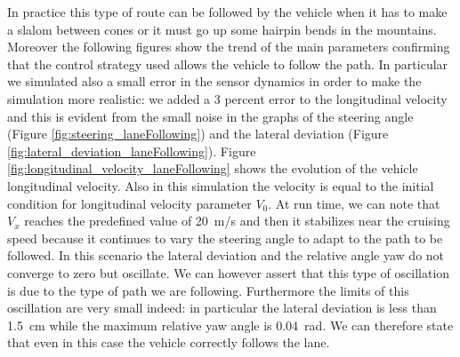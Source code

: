 In practice this type of route can be followed by the vehicle when it has to make a slalom between cones or it must go up some hairpin bends in the mountains. Moreover the following figures show the trend of the main parameters confirming that the control strategy used allows the vehicle to follow the path. In particular we simulated also a small error in the sensor dynamics in order to make the simulation more realistic: we added a 3 percent error to the longitudinal velocity and this is evident from the small noise in the graphs of the steering angle (Figure \ref{fig:steering_laneFollowing}) and the lateral deviation (Figure \ref{fig:lateral_deviation_laneFollowing}).
Figure {\ref{fig:longitudinal_velocity_laneFollowing}} shows the evolution of the vehicle longitudinal velocity. Also in this simulation the velocity is equal to the initial condition for longitudinal velocity parameter $V_0$. At run time, we can note that $V_x$ reaches the predefined value of \SI{20}{m/s} and then it stabilizes near the cruising speed because it continues to vary the steering angle to adapt to the path to be followed. In this scenario the lateral deviation and the relative angle yaw do not converge to zero but oscillate. We can however assert that this type of oscillation is due to the type of path we are following. Furthermore the limits of this oscillation are very small indeed: in particular the lateral deviation is less than \SI{1.5}{cm} while the maximum relative yaw angle is \SI{0.04}{rad}. We can therefore state that even in this case the vehicle correctly follows the lane.
\newpage

